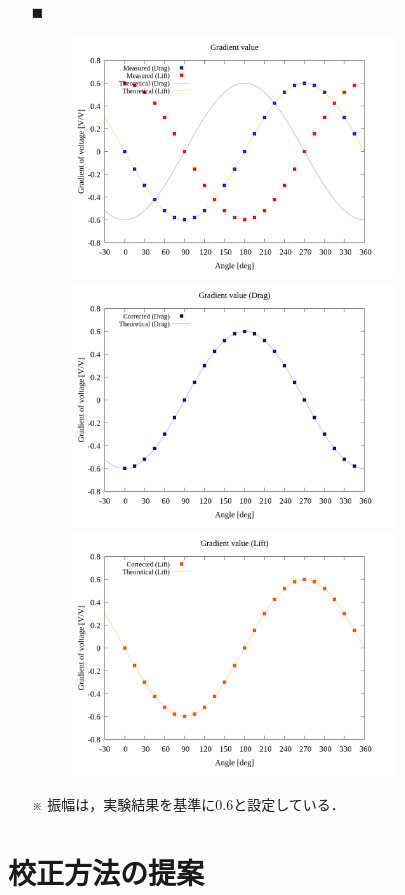 \documentclass[twocolumn,a4j]{jsarticle}
\begin{document}
\newpage

\begin{itemize}
    \item [$\blacksquare$] \\
          \begin{figure}[htbp]
              \footnotesize
              \begin{center}
                  \includegraphics[width=86mm]{../graphes/simulation_900_900/20/20_adjust-value.png}
                  \caption{}
                  \includegraphics[width=86mm]{../graphes/simulation_900_900/21/21-2_corrected_drag.png}
                  \caption{}
                  \includegraphics[width=86mm]{../graphes/simulation_900_900/21/21-2_corrected_lift.png}
                  \caption{}
              \end{center}
          \end{figure}
    \item [※] 振幅は，実験結果を基準に0.6と設定している．
\end{itemize}



\section{校正方法の提案}
\end{document}
